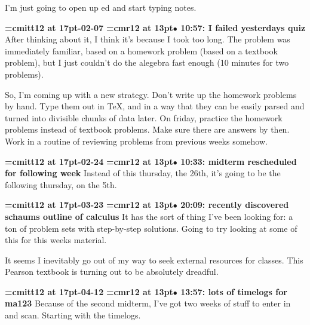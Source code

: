 I'm just going to open up ed and start typing notes.
\par

{\medskip\noindent\bf\font\titlefont=cmitt12 at 17pt-02-07}\medskip
{\smallskip\noindent\bf\font\titlefont=cmr12 at 13pt\titlefont $\bullet$ 10:57: I failed yesterdays quiz}\smallskip
After thinking about it, I think it's because I took too long. The problem was immediately familiar, based on a homework problem (based on a textbook problem), but I just couldn't do the alegebra fast enough (10 minutes for two problems).
\par

So, I'm coming up with a new strategy. Don't write up the homework problems by hand. Type them out in TeX, and in a way that they can be easily parsed and turned into divisible chunks of data later. On friday, practice the homework problems instead of textbook problems. Make sure there are answers by then. Work in a routine of reviewing problems from previous weeks somehow.
\par

{\medskip\noindent\bf\font\titlefont=cmitt12 at 17pt-02-24}\medskip
{\smallskip\noindent\bf\font\titlefont=cmr12 at 13pt\titlefont $\bullet$ 10:33: midterm rescheduled for following week}\smallskip
Instead of this thursday, the 26th, it's going to be the following thursday, on the 5th.
\par

{\medskip\noindent\bf\font\titlefont=cmitt12 at 17pt-03-23}\medskip
{\smallskip\noindent\bf\font\titlefont=cmr12 at 13pt\titlefont $\bullet$ 20:09: recently discovered schaums outline of calculus}\smallskip
It has the sort of thing I've been looking for: a ton of problem sets with step-by-step solutions. Going to try looking at some of this for this weeks material.
\par

It seems I inevitably go out of my way to seek external resources for classes. This Pearson textbook is turning out to be absolutely dreadful.
\par

{\medskip\noindent\bf\font\titlefont=cmitt12 at 17pt-04-12}\medskip
{\smallskip\noindent\bf\font\titlefont=cmr12 at 13pt\titlefont $\bullet$ 13:57: lots of timelogs for ma123}\smallskip
Because of the second midterm, I've got two weeks of stuff to enter in and scan. Starting with the timelogs.
\par


